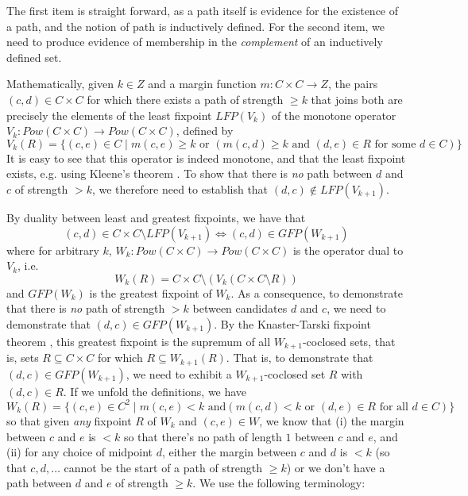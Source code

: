 \noindent
The first item is straight forward, as a path itself is evidence for the
existence of a path, and the notion of path is inductively defined.
For the second item, we need to produce evidence of membership in
the \emph{complement} of an inductively defined set.

Mathematically, given $k \in Z$ and a margin function $m: C \times C
\to Z$, the pairs $(c, d) \in C \times C$ for which there exists a
path of strength $\geq k$ that joins both are precisely the elements
of the least fixpoint $LFP(V_k)$ of the monotone operator $V_k:
Pow(C \times C) \to Pow(C \times C)$, defined by
\[ V_k(R) = \lbrace (c, e) \in C \mid m(c, e) \geq k \mbox{ or }
(m(c, d) \geq k \mbox{ and } (d, e) \in R \mbox{ for some } d \in C)
\rbrace \]
It is easy to see that this operator is indeed monotone, and that
the least fixpoint exists, e.g. using Kleene's theorem
\cite{Stoltenberg-Hansen:1994:MTD}.  To show that there is \emph{no}
path between $d$ and $c$ of strength $> k$, we therefore need to
establish that
$(d, c) \notin LFP(V_{k+1})$.

By duality between least and greatest fixpoints, we have that \[
(c, d) \in C \times C
\setminus LFP(V_{k+1}) \iff (c,d) \in GFP(W_{k+1}) \]
where for arbitrary $k$, $W_k: Pow(C \times C) \to Pow(C \times C)$ is the operator dual
to $V_k$, i.e.
\[ W_k(R) = C \times C \setminus (V_k (C\times C \setminus R)) \]
and $GFP(W_k)$ is the greatest fixpoint of $W_k$.
As a consequence, to demonstrate that there is \emph{no} path of
strength $> k$ between candidates $d$ and $c$, we need to
demonstrate that $(d, c) \in GFP(W_{k+1})$. By the Knaster-Tarski fixpoint
theorem \cite{Tarski:1955:LTF}, this greatest fixpoint is the supremum of all
$W_{k+1}$-coclosed sets, that is, sets $R \subseteq C \times C$ for which
$R \subseteq W_{k+1}(R)$.
That is, to demonstrate that $(d, c) \in GFP(W_{k+1})$, we need
to exhibit a $W_{k+1}$-coclosed set $R$ with $(d, c) \in R$.
If we unfold the definitions, we have
\[ W_k(R) = \lbrace (c, e) \in C^2 \mid m(c, e) < k \mbox{ and
} (m(c, d) < k \mbox{ or } (d,e) \in R \mbox{ for all } d \in C)
\rbrace \]
so that given \emph{any} fixpoint $R$ of $W_k$ and $(c, e) \in W$, we
know that (i) the margin between $c$ and $e$ is $< k$ so that
there's no path of length $1$ between $c$ and $e$, and (ii) for any
choice of midpoint $d$, either the margin between $c$ and $d$ is $<
k$ (so that $c, d, \dots$ cannot be the start of a path of strength
$\geq k$) or we don't have a path between $d$ and $e$ of strength
$\geq k$. We use the following terminology:

